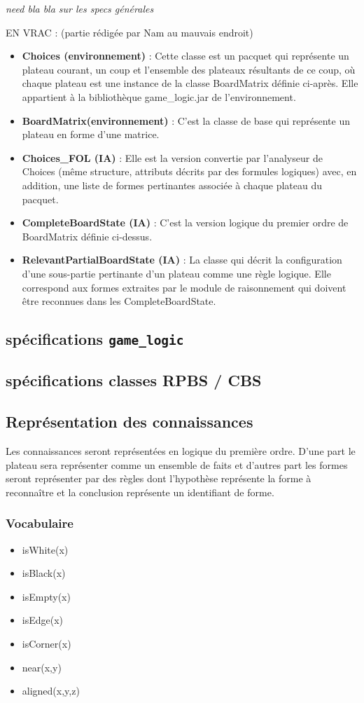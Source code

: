\emph{need bla bla sur les specs générales}

EN VRAC :
(partie rédigée par Nam au mauvais endroit)

\begin{itemize}
  \item \textbf {Choices (environnement)} : Cette classe est un pacquet qui représente un plateau courant, un coup et l'ensemble des plateaux résultants de ce coup, où chaque plateau est une instance de la classe BoardMatrix définie ci-après. Elle appartient à la bibliothèque game\_logic.jar de l'environnement.
  \item \textbf {BoardMatrix(environnement)} : C'est la classe de base qui représente un plateau en forme d'une matrice. 
  \item \textbf {Choices\_FOL (IA)} : Elle est la version convertie par l'analyseur de Choices (même structure, attributs décrits par des formules logiques) avec, en addition, une liste de formes pertinantes associée à chaque plateau du pacquet.
  \item \textbf {CompleteBoardState (IA)} : C'est la version logique du premier ordre de
  BoardMatrix définie ci-dessus.
  \item \textbf {RelevantPartialBoardState (IA)} : La classe qui décrit la configuration d'une sous-partie pertinante d'un plateau comme une règle logique. Elle correspond aux \og formes \fg{} extraites par le module de raisonnement qui doivent être reconnues dans les CompleteBoardState.
\end{itemize}

\subsection{spécifications \texttt{game\_logic}}
\label{specs_game_logic}
\subsection{spécifications classes RPBS / CBS}
\label{specs_shared_classes}
\subsection{Représentation des connaissances}
	Les connaissances seront représentées en logique du première ordre. D'une part le plateau sera représenter comme un ensemble de faits et d'autres part les \og formes \fg{} seront représenter par des règles dont l'hypothèse représente la forme à reconnaître et la conclusion représente un identifiant de forme.
	
	\subsubsection{Vocabulaire} 
	\begin{itemize}
	\item isWhite(x)
  \item isBlack(x)
  \item isEmpty(x)
  \item isEdge(x)
  \item isCorner(x)
  \item near(x,y)
  \item aligned(x,y,z)
	\end{itemize}

\label{specs_voc_fol}